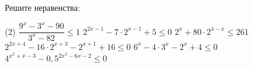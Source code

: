 \begin{homework}[number=1]
	\begin{listofex}
		\item Решите неравенства: %
		\begin{tasks}(2)
			\task \( \dfrac{ 9^x-3^x-90 }{ 3^x-82 } \le 1 \)
			\task \( 2^{2x-1}-7 \cdot 2^{x-1}+5 \le 0 \)
			\task \( 2^x+80 \cdot 2^{4-x} \le 261 \)
			\task \( 2^{2x+4}-16 \cdot 2^{x+3}-2^{x+1}+16 \le 0 \)
			\task \( 6^x-4 \cdot 3^x-2^x+4 \le 0 \)
			\task \( 4^{x^2+x-3}-0,5^{2x^2-6x-2} \le 0 \)
		\end{tasks}
	\end{listofex}
\end{homework}


